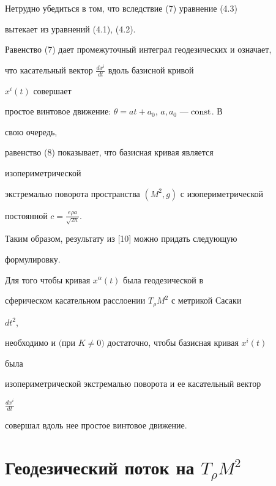 Нетрудно убедиться в том, что вследствие (7) уравнение (4.3) 


вытекает из уравнений (4.1), (4.2). 


 


Равенство (7) дает промежуточный интеграл геодезических и означает, 


что касательный вектор $\frac{d x^i}{d t}$ вдоль базисной кривой 


$x^i(t)$ совершает 


простое винтовое движение: $\theta=at+a_0$, $a,a_0$ --- $\operatorname{const}$. В 


свою очередь, 


равенство (8) показывает, что базисная кривая является 


изопериметрической 


экстремалью поворота пространства $(M^2,g)$ с изопериметрической 


постоянной $c=\frac{e\rho a}{\sqrt{2h}}$.


 


Таким образом, результату из [10] можно придать следующую 


формулировку.


 


\begin{thm} 


Для того чтобы кривая $x^\alpha(t)$ была геодезической в 


сферическом касательном расслоении $T_\rho M^2$ с метрикой Сасаки 


$d{}t^2$, 


необходимо и $($при $K\ne0)$ достаточно, чтобы базисная кривая $x^i(t)$ 


была 


изопериметрической экстремалью поворота и ее касательный вектор 


$\frac{d x^i}{d t}$ 


совершал вдоль нее простое винтовое движение. 


\end{thm} 


 


\section{Геодезический поток на $T_\rho M^2$} 


